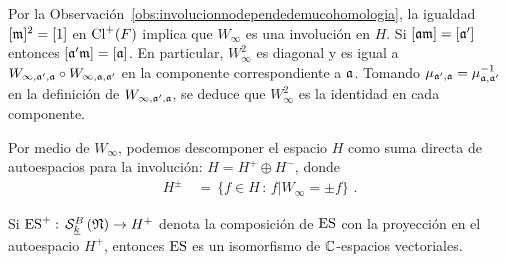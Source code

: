 Por la Observaci\'{o}n~\ref{obs:involucionnodependedemucohomologia}, la
igualdad $[\frak{m}]^{2}=[1]$ en $\pClass{F}$ implica que $W_{\infty}$ es una
involuci\'{o}n en $H$. Si $[\frak{a}\frak{m}]=[\frak{a}']$ entonces
$[\frak{a}'\frak{m}]=[\frak{a}]$. En particular, $W_{\infty}^{2}$ es
diagonal y es igual a
\begin{math}
	W_{\infty,\frak{a}',\frak{a}}\circ W_{\infty,\frak{a},\frak{a}'}
\end{math}
en la componente correspondiente a $\frak{a}$. Tomando
$\mu_{\frak{a}',\frak{a}}=\mu_{\frak{a},\frak{a}'}^{-1}$ en la definici\'{o}n
de $W_{\infty,\frak{a}',\frak{a}}$, se deduce que $W_{\infty}^{2}$ es la
identidad en cada componente.

Por medio de $W_{\infty}$, podemos descomponer el espacio $H$ como suma directa
de autoespacios para la involuci\'{o}n: $H=H^{+}\oplus H^{-}$, donde
\begin{align*}
	H^{\pm} & \,=\,\Big\{f\in H\,:\,f\big\vert W_{\infty}=\pm f\Big\}
	\text{ .}
\end{align*}
%

\begin{teoEichlerShimura}%
	\label{thm:eichlershimura}
	Si $\ES^{+}:\,\spitzH[B]{k}{\frak{N}}\rightarrow H^{+}$ denota la
	composici\'{o}n de $\ES$ con la proyecci\'{o}n en el autoespacio
	$H^{+}$, entonces $\ES$ es un isomorfismo de $\bb{C}$-espacios
	vectoriales.
\end{teoEichlerShimura}

